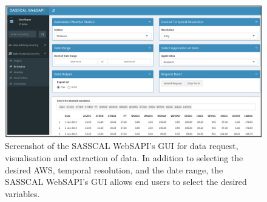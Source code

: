 \documentclass[a4paper, 10pt, conference]{ieeeconf}      %
\begin{document}
\begin{figure}
	\centering
	\includegraphics[width=1\linewidth, height=0.4\textheight]{fig/BW_Data}
	\caption{Screenshot of the SASSCAL WebSAPI's GUI for data request, visualisation and extraction of data. 
 In addition to selecting the desired AWS,    temporal resolution, and the date range, the SASSCAL WebSAPI's GUI allows end users to select the desired  variables.
}
	\label{SASSCAL_WebSAPIA}
\end{figure}


\twocolumn
\noindent
\end{document}
